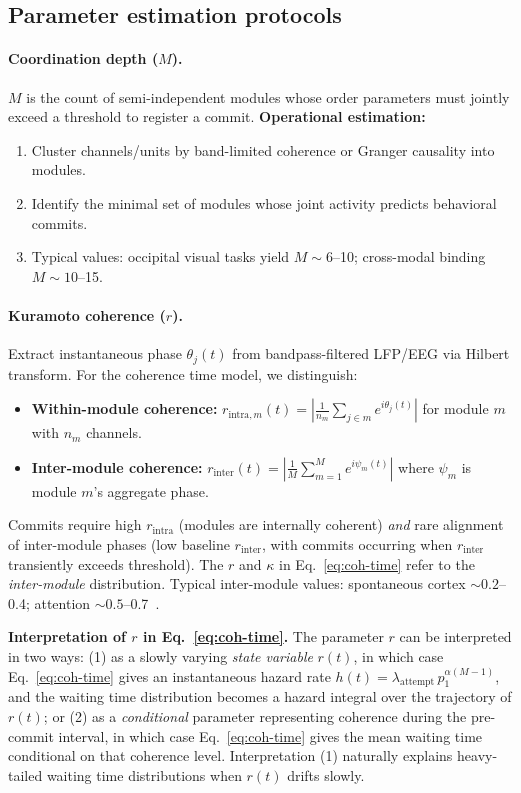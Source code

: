 \documentclass[12pt]{article}
\begin{document}
\subsection{Parameter estimation protocols}

\paragraph{Coordination depth ($M$).} $M$ is the count of semi-independent modules whose order parameters must jointly exceed a threshold to register a commit.
\textbf{Operational estimation:}
\begin{enumerate}
\item Cluster channels/units by band-limited coherence or Granger causality into modules.
\item Identify the minimal set of modules whose joint activity predicts behavioral commits.
\item Typical values: occipital visual tasks yield $M \sim 6$--10; cross-modal binding $M \sim 10$--15.
\end{enumerate}

\paragraph{Kuramoto coherence ($r$).} Extract instantaneous phase $\theta_j(t)$ from bandpass-filtered LFP/EEG via Hilbert transform. For the coherence time model, we distinguish:
\begin{itemize}
\item \textbf{Within-module coherence:} $r_{\mathrm{intra},m}(t) = \left|\frac{1}{n_m}\sum_{j \in m} e^{i\theta_j(t)}\right|$ for module $m$ with $n_m$ channels.
\item \textbf{Inter-module coherence:} $r_{\mathrm{inter}}(t) = \left|\frac{1}{M}\sum_{m=1}^M e^{i\psi_m(t)}\right|$ where $\psi_m$ is module $m$'s aggregate phase.
\end{itemize}
Commits require high $r_{\mathrm{intra}}$ (modules are internally coherent) \emph{and} rare alignment of inter-module phases (low baseline $r_{\mathrm{inter}}$, with commits occurring when $r_{\mathrm{inter}}$ transiently exceeds threshold). The $r$ and $\kappa$ in Eq.~\ref{eq:coh-time} refer to the \emph{inter-module} distribution. Typical inter-module values: spontaneous cortex $\sim 0.2$--0.4; attention $\sim 0.5$--0.7~\cite{fries2015,womelsdorf2007}.

\textbf{Interpretation of $r$ in Eq.~\ref{eq:coh-time}.} The parameter $r$ can be interpreted in two ways: (1) as a slowly varying \emph{state variable} $r(t)$, in which case Eq.~\ref{eq:coh-time} gives an instantaneous hazard rate $h(t) = \lambda_{\mathrm{attempt}}\, p_1^{\alpha(M-1)}$, and the waiting time distribution becomes a hazard integral over the trajectory of $r(t)$; or (2) as a \emph{conditional} parameter representing coherence during the pre-commit interval, in which case Eq.~\ref{eq:coh-time} gives the mean waiting time conditional on that coherence level. Interpretation (1) naturally explains heavy-tailed waiting time distributions when $r(t)$ drifts slowly.
\end{document}
